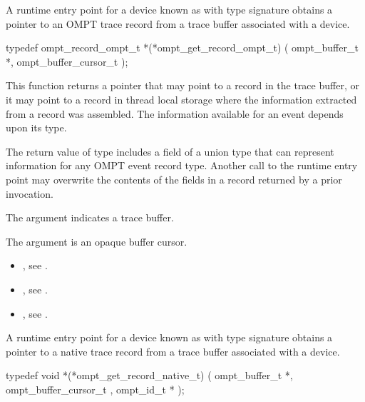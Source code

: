 \label{sec:ompt_get_record_ompt_t}

\summary
A runtime entry point for a device known as 
with type signature 
obtains a pointer to an OMPT trace record from a trace buffer associated with a device.

\format
\begin{ccppspecific}
\begin{omptInquiry}
typedef ompt_record_ompt_t *(*ompt_get_record_ompt_t) (
  ompt_buffer_t *,
  ompt_buffer_cursor_t 
);
\end{omptInquiry}
\end{ccppspecific}

\descr

This function returns a pointer that may point to a record in the
trace buffer, or it may point to a record in thread local storage
where the information extracted from a record was assembled. The
information available for an event depends upon its type.

The return value of type 
includes a field of a union type that can represent
information for any OMPT event record type.
Another call to the runtime entry point may overwrite the
contents of the fields in a record returned by a prior invocation.

\argdesc
The argument  indicates a trace buffer.

The argument  is an opaque buffer cursor.

\crossreferences
\begin{itemize}
\item {},
see .
\item {},
see .
\item {},
see .
\end{itemize}

\label{sec:ompt_get_record_native_t}

\summary

A runtime entry point for a device known as
 with type signature
obtains a pointer to a native trace record from a trace buffer associated with a device.

\format
\begin{ccppspecific}
\begin{omptInquiry}
typedef void *(*ompt_get_record_native_t) (
  ompt_buffer_t *,
  ompt_buffer_cursor_t ,
  ompt_id_t *
);
\end{omptInquiry}
\end{ccppspecific}

